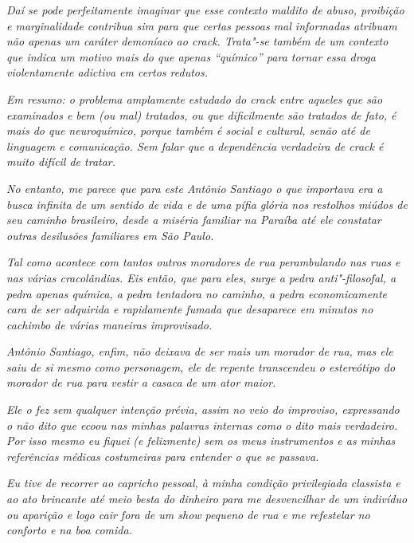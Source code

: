 \emph{Daí se pode perfeitamente imaginar que esse contexto maldito de
abuso, proibição e marginalidade contribua sim para que certas pessoas
mal informadas atribuam não apenas um caráter demoníaco ao crack.
Trata"-se também de um contexto que indica um motivo mais do que apenas
``químico'' para tornar essa droga violentamente adictiva em certos
redutos.}~

\emph{Em resumo: o problema amplamente estudado do crack entre aqueles
que são examinados e bem (ou mal) tratados, ou que dificilmente são
tratados de fato, é mais do que neuroquímico, porque também é social e
cultural, senão até de linguagem e comunicação. Sem falar que a
dependência verdadeira de crack é muito difícil de tratar.}~

\emph{No entanto, me parece que para este Antônio Santiago o que
importava era a busca infinita de um sentido de vida e de uma pífia
glória nos restolhos miúdos de seu caminho brasileiro, desde a miséria
familiar na Paraíba até ele constatar outras desilusões familiares em
São Paulo.}~

\emph{Tal como acontece com tantos outros moradores de rua perambulando
nas ruas e nas várias cracolândias. Eis então, que para eles, surge a
pedra anti"-filosofal, a pedra apenas química, a pedra tentadora no
caminho, a pedra economicamente cara de ser adquirida e rapidamente
fumada que desaparece em minutos no cachimbo de várias maneiras
improvisado.}~

\emph{Antônio Santiago, enfim, não deixava de ser mais um morador de
rua, mas ele saiu de si mesmo como personagem, ele de repente
transcendeu o estereótipo do morador de rua para vestir a casaca de um
ator maior.}~

\emph{Ele o fez sem qualquer intenção prévia, assim no veio do
improviso, expressando o não dito que ecoou nas minhas palavras internas
como o dito mais verdadeiro. Por isso mesmo eu fiquei (e felizmente) sem
os meus instrumentos e as minhas referências médicas costumeiras para
entender o que se passava.}~

\emph{Eu tive de recorrer ao capricho pessoal, à minha condição
privilegiada classista e ao ato brincante até meio besta do dinheiro
para me desvencilhar de um indivíduo ou aparição e logo cair fora de um
show pequeno de rua e me refestelar no conforto e na boa comida.~}
